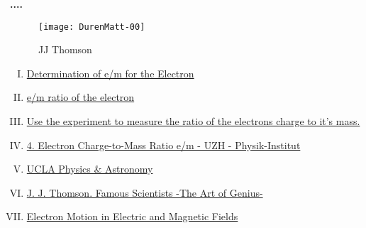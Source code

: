 \documentclass[../main.tex]{subfiles}
\begin{document}
\textbf{....}
        \begin{figure}[bh]
        \centering
        \texttt{[image: DurenMatt-00]}
        \label{fig:img1}
        \caption{JJ Thomson}
    \end{figure}
    
\begin{enumerate}[I. ]
    \item \href{https://www.webassign.net/question_assets/unccolphyseml1/lab_4/manual.html}{Determination of e/m for the Electron}
    \item \href{https://physicsx.erau.edu/HelmholtzCoils/Lab_MP_1.pdf}{e/m ratio of the electron}
    \item \href{https://virtuelle-experimente.de/en/b-feld/e-m-bestimmung/edurchm.php}{Use the experiment to measure the ratio of the electrons charge to it's mass.}{}
    \item \href{https://www.physik.uzh.ch/~matthias/espace-assistant/manuals/en/anleitung_etom_e.pdf}{4. Electron Charge-to-Mass Ratio e/m - UZH - Physik-Institut}
    \item \href{https://demoweb.physics.ucla.edu/6b-lab-manual}{UCLA Physics & Astronomy}
     \item \href{https://www.famousscientists.org/j-j-thomson/}{J. J. Thomson. Famous Scientists -The Art of Genius-}
     \item \href{https://virtuelle-experimente.de/en/index.php}{Electron Motion in Electric and Magnetic Fields}
\end{enumerate}
\end{document}
